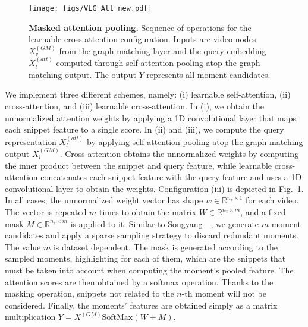 \documentclass[10pt,twocolumn,letterpaper]{article}
\begin{document}
\begin{figure}[!t]
\centering
    \texttt{[image: figs/VLG\_Att\_new.pdf]}
    \caption{\textbf{Masked attention pooling.} Sequence of operations for the learnable cross-attention configuration. Inputs are video nodes $X_v^{(GM)}$ from the graph matching layer and the query embedding $X_l^{(att)}$ computed through self-attention pooling atop the graph matching output. The output $Y$ represents all moment candidates.}
    \label{fig:att}
    \vspace{-0.2cm}
\end{figure}

We implement three different schemes, namely: (i) learnable self-attention, (ii) cross-attention, and (iii) learnable cross-attention. In (i), we obtain the unnormalized attention weights by applying a 1D convolutional layer that maps each snippet feature to a single score. In (ii) and (iii), we compute the query representation $X_l^{(att)}$ by applying self-attention pooling atop the graph matching output $X_l^{(GM)}$. Cross-attention obtains the unnormalized weights by computing the inner product between the snippet and query feature, while learnable cross-attention concatenates each snippet feature with the query feature and uses a 1D convolutional layer to obtain the weights. Configuration (iii) is depicted in Fig.~\ref{fig:att}.  In all cases, the unnormalized weight vector has shape $w\in \mathbb{R}^{n_v \times 1}$ for each video. The vector is repeated $m$ times to obtain the matrix $W\in \mathbb{R}^{n_v \times m}$, and a fixed mask $M\in \mathbb{R}^{n_v \times m}$ is applied to it. Similar to  Songyang~\etal~\cite{2DTAN_2020_AAAI}, we generate $m$ moment candidates and apply a sparse sampling strategy to discard redundant moments. The value $m$ is dataset dependent. 
The mask is generated according to the sampled moments, highlighting for each of them, which are the snippets that must be taken into account when computing the moment's pooled feature. 
The attention scores are then obtained by a softmax operation. Thanks to the masking operation, snippets not related to the $n$-th moment will not be considered. Finally, the moments' features are obtained simply as a matrix multiplication $Y = X^{(GM)}  \mathrm{SoftMax}(W+M)$. 
\end{document}

